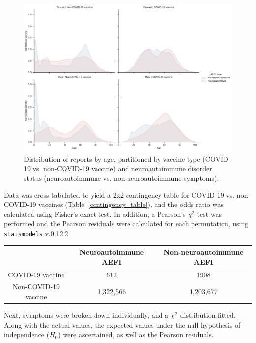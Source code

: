 \documentclass[idr,communication,submit,oneauthor,pdftex]{Definitions/mdpi}
\begin{document}
\begin{figure}[H]
\includegraphics[width=12.5 cm]{age_distribution}
\caption{Distribution of reports by age, partitioned by vaccine type (COVID-19 vs. non-COVID-19 vaccine) and
neuroautoimmune disorder status (neuroautoimmune vs. non-neuroautoimmune symptoms).\label{distribution_by_age}}
\end{figure}

Data was cross-tabulated to yield a 2x2 contingency table for COVID-19 vs. non-COVID-19 vaccines
(Table~\ref{contingency_table}), and the odds ratio was calculated using Fisher's exact test. In addition, a
Pearson's $\chi^2$ test was performed and the Pearson residuals were calculated for each permutation, using
\texttt{statsmodels} v.0.12.2.\cite{seabold2010statsmodels}

\begin{specialtable}[H]
\caption{2x2 contingency table by vaccine type (COVID-19 vs. non-COVID-19 vaccine) and neuroautoimmune
disorder status.\label{contingency_table}}
\begin{tabular}{ccc}
\toprule
& \textbf{Neuroautoimmune AEFI}	& \textbf{Non-neuroautoimmune AEFI}\\
\midrule
COVID-19 vaccine	    	& 612			    & 1908  \\
Non-COVID-19 vaccine		& 1,322,566			& 1,203,677\\
\bottomrule
\end{tabular}
\end{specialtable}

Next, symptoms were broken down individually, and a $\chi^2$ distribution fitted. Along with the actual values, the
expected values under the null hypothesis of independence ($H_0$) were ascertained, as well as the Pearson residuals.
\end{document}
